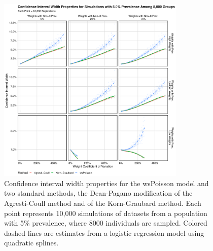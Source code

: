 \begin{figure}
\centering
\includegraphics[width=0.8\textwidth]{perfect_confidence_interval_width_8000_groups_0_05_prev}
\caption{Confidence interval width properties for the wsPoisson model and two standard methods, the Dean-Pagano modification of the Agresti-Coull method and of the Korn-Graubard method.
Each point represents 10,000 simulations of datasets from a population with 5\% prevalence, where 8000 individuals are sampled.
Colored dashed lines are estimates from a logistic regression model using quadratic splines.}
\label{ch_3:fig:perfect_confidence_interval_width_8000_groups_0_05_prev}
\end{figure}


